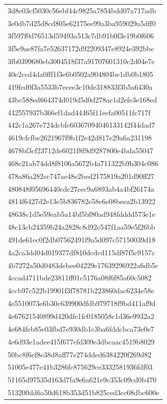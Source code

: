 \begin{tabular}{l}
3d8e03cf5030c56ebf44c9825a7854bdd07a717adb \\
3e0db7d25d8cd805e62175ee99a3ba959029a5dff0 \\
3f597f0d76513d59493a513c7db91b0f3e19b0f606 \\
3f5e9ae87fa7e52637172d92209347e8924e392bbc \\
3fb0399680eb3004518f37a91707601310c2d04e7e \\
40e2ccd4da0fff1f3e6b0502a904804be1db0b1805 \\
419fed0f3a5533b7ecee3c10de318833f3b5a6430a \\
43bc588ed664374d019d5d0d278ac1d2efe3e168ed \\
442557937b366ef1dad44465f11eefa00511fc717f \\
442c1a267e724dcbfc60367094046133142f44dad7 \\
4619cfcfbe2621967f9b1f2e42d817e29a6a231198 \\
4678bf3cf23712de6021f8f9d9287800e4bda55047 \\
468e21ab74dd8f8106a5672b4a711322b9b304c086 \\
478a86a282cc747ae48e2bed2175819a201d90ff27 \\
480848f05696440cdc27cec9a6893ab4a4bf26174a \\
4814f6427d2e13e5b836782e58e6e08beea2b13922 \\
48638c1d5e59eab5a14bf5bf80ad948fdddd573e1e \\
48c13cb24359b24a2828c8d92c547f1aa59e5f26bb \\
491de61ec0f2db07562491f9a5d097c57150039d18 \\
4a2ca3dd04d019377df810dcdcd115df87f5c9157c \\
4b7272a50d0483debee04229e17639296922a6db5c \\
4ccad4711bde23811ff01c5176a08f6f85a60c5082 \\
4ccb97c522b19901f3f78781b223860dac6234e58e \\
4e5510073e6b30c639900dfdb979718f9bd411af9d \\
4e67621540899d420dfe1fc0185058c1d36e9932a2 \\
4e684feb85e03fbd7e930db1c3ba6fddcbca73e0e7 \\
4e6d93e1adee415f677efd309e3dbcaac4519b8029 \\
50bc8f6ef8e38d8aff77e274dded6384220f269d82 \\
51005e477e41b3286fc875629ce3332581936fdf03 \\
51165d97535d163d7fa9e6a621e9c353c09cd0b470 \\
513200dd6a50d618b353d51b825ced3cc08dbc600e \\

\end{tabular}
